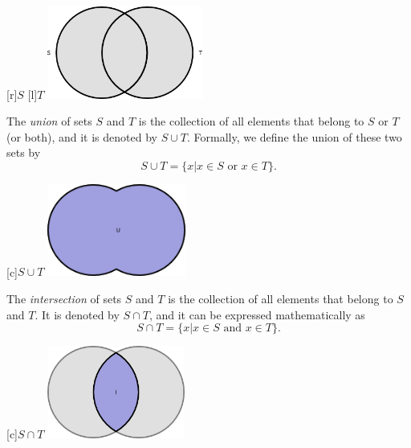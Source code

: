 \begin{center}
\begin{psfrags}
[r]{$S$}
[l]{$T$}
\includegraphics[height=3.03cm]{Figures/1Chapter/sets}
\end{psfrags}
\end{center}

The \emph{union} of sets $S$ and $T$ is the collection of all elements that belong to $S$ or $T$ (or both), and it is denoted by $S \cup T$. 
Formally, we define the union of these two sets by
\begin{equation*}
S \cup T = \{ x | x \in S \text{ or } x \in T \} .
\end{equation*}

\begin{center}
\begin{psfrags}
[c]{$S \cup T$}
\includegraphics[height=3.03cm]{Figures/1Chapter/union}
\end{psfrags}
\end{center}

The \emph{intersection} of sets $S$ and $T$ is the collection of all elements that belong to $S$ and $T$. 
It is denoted by $S \cap T$, and it can be expressed mathematically as
\begin{equation*}
S \cap T = \{ x | x \in S \text{ and } x \in T \} .
\end{equation*}

\begin{center}
\begin{psfrags}
[c]{$S \cap T$}
\includegraphics[height=3.03cm]{Figures/1Chapter/intersection}
\end{psfrags}
\end{center}

